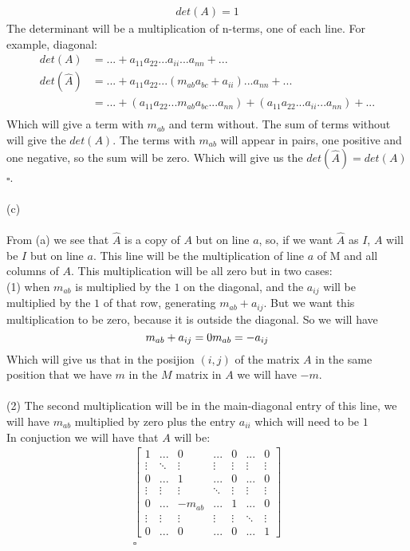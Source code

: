 \documentclass[10pt,a4paper]{article}
\begin{document}
	 \begin{align*}
	 	det(A) = 1
	 \end{align*}
	 The determinant will be a multiplication of n-terms, one of each line.
	 For example, diagonal:
	 \begin{align*}
	 	det(A) &= ... + a_{11}a_{22}...a_{ii}...a_{nn} + ...\\
	 	det(\hat{A}) &= ... + a_{11}a_{22}...(m_{ab}a_{bc}+a_{ii})...a_{nn} + ...\\	 	
	 	&= ... + (a_{11}a_{22}...m_{ab}a_{bc}...a_{nn})+(a_{11}a_{22}...a_{ii}...a_{nn}) + ...\\	 	
	 \end{align*}
	 Which will give a term with $m_{ab}$ and term without. The sum of terms without will give the $det(A)$. The terms with $m_{ab}$ will appear in pairs, one positive and one negative, so the sum will be zero. Which will give us the $det(\hat{A})=det(A)$ $\square$.\\
	 \\
	 (c)\\
	 \\
	 From (a) we see that $\hat{A}$ is a copy of $A$ but on line $a$, so, if we want $\hat{A}$ as $I$, $A$ will be $I$ but on line $a$. This line will be the multiplication of line $a$ of M and all columns of $A$. This multiplication will be all zero but in two cases:\\
	 (1) when $m_{ab}$ is multiplied by the $1$ on the diagonal, and the $a_{ij}$ will be multiplied by the $1$ of that row, generating $m_{ab}+a_{ij}$. But we want this multiplication to be zero, because it is outside the diagonal. So we will have
	 $$
	 m_{ab}+a_{ij} = 0\\
	 m_{ab}=-a_{ij}
	 $$
	 Which will give us that in the posijion $(i,j)$ of the matrix $A$ in the same position that we have $m$ in the $M$ matrix in $A$ we will have $-m$.\\
	 \\
	 (2) The second multiplication will be in the main-diagonal entry of this line, we will have $m_{ab}$ multiplied by zero plus the entry $a_{ii}$ which will need to be $1$
	 \\
	 In conjuction we will have that $A$ will be:
	 \begin{align*}
	 	\begin{bmatrix}
		 1&...&0&...&0&...&0\\
		 \vdots&\ddots&\vdots&\vdots&\vdots&\vdots&\vdots\\
		 0&...&1&...&0&...&0\\
		 \vdots&\vdots&\vdots&\ddots&\vdots&\vdots&\vdots\\
		 0&...&-m_{ab}&...&1&...&0\\
		 \vdots&\vdots&\vdots&\vdots&\vdots&\ddots&\vdots\\		
		 0&...&0&...&0&...&1
		 \end{bmatrix}\\
		 \square
	 \end{align*}
\end{document}
